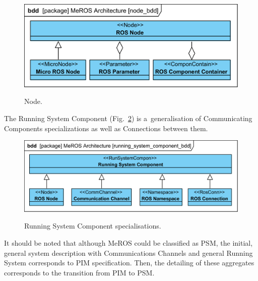 \documentclass[11pt,oneside,a4paper]{report}
\begin{document}
	 
 	\begin{figure}[H]
	 	\centering
	 	\begin{center}
	 		{\includegraphics[scale=1.0]{diagrams/node_bdd.png}}
	 	\end{center}
	 	\caption{Node.} 
		 	\label{fig:node_bdd}
	 \end{figure}
	 
	The Running System Component (Fig.~\ref{fig:running_system_component_bdd}) is a~generalisation of Communicating Components specializations as well as Connections between them.
	

	\begin{figure}[H]
		\centering
		\begin{center}
			{\includegraphics[scale=1.0]{diagrams/running_system_component_bdd.png}}
		\end{center}
		\caption{Running System Component specialisations.} 
		\label{fig:running_system_component_bdd}
	\end{figure} 
	 	 

	It should be noted that although MeROS could be classified as PSM, the initial, general system description with Communications Channels and general Running System corresponds to PIM specification. Then, the detailing of these aggregates corresponds to the transition from PIM to PSM. 
	
		
%
%
	
\end{document}
